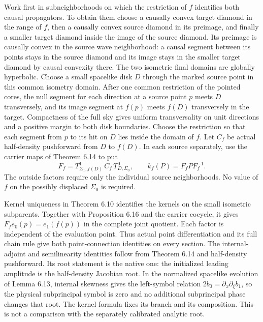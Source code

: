 \documentclass[
  english,
  11pt,
  reqno]{amsart}
\begin{document}
Work first in subneighborhoods on which the restriction of \(f\)
identifies both causal propagators. To obtain them choose a causally
convex target diamond in the range of \(f\), then a causally convex
source diamond in its preimage, and finally a smaller target diamond
inside the image of the source diamond. Its preimage is causally convex
in the source wave neighborhood: a causal segment between its points
stays in the source diamond and its image stays in the smaller target
diamond by causal convexity there. The two isometric final domains are
globally hyperbolic. Choose a small spacelike disk \(D\) through the
marked source point in this common isometry domain. After one common
restriction of the pointed cores, the null segment for each direction at
a source point \(p\) meets \(D\) transversely, and its image segment at
\(f(p)\) meets \(f(D)\) transversely in the target. Compactness of the
full sky gives uniform transversality on unit directions and a positive
margin to both disk boundaries. Choose the restriction so that each
segment from \(p\) to its hit on \(D\) lies inside the domain of \(f\).
Let \(C_f\) be actual half-density pushforward from \(D\) to \(f(D)\).
In each source separately, use the carrier maps of Theorem 6.14 to put%
 \[
F_f=T^1_{\Sigma_1,f(D)}\,C_f\,T^0_{D,\Sigma_0},
\qquad k_f(P)=F_fPF_f^{-1}.
\] The outside factors require only the individual source neighborhoods.
No value of \(f\) on the possibly displaced \(\Sigma_0\) is required.

Kernel uniqueness in Theorem 6.10 identifies the kernels on the small
isometric subparents. Together with Proposition 6.16 and the carrier
cocycle, it gives \(F_fe_0(p)=e_1(f(p))\) in the complete joint
quotient. Each factor is independent of the evaluation point. Thus
actual point differentiation and its full chain rule give both
point-connection identities on every section. The internal-adjoint and
semilinearity identities follow from Theorem 6.14 and half-density
pushforward. Its root statement is the native one: the initialized
leading amplitude is the half-density Jacobian root. In the normalized
spacelike evolution of Lemma 6.13, internal skewness gives the
left-symbol relation \(2b_0=\partial_x\partial_\xi b_1\), so the
physical subprincipal symbol is zero and no additional subprincipal
phase changes that root. The kernel formula fixes its branch and its
composition. This is not a comparison with the separately calibrated
analytic root.
\end{document}

